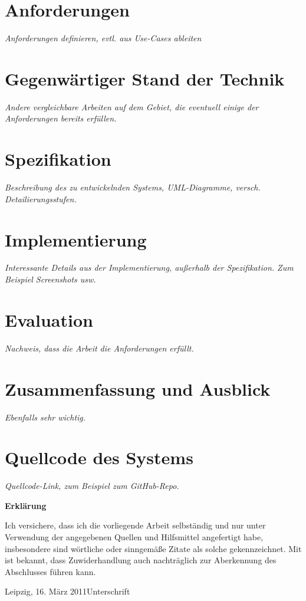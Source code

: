 \documentclass[%
  parskip=half,
  ]{scrreprt} %
\newcommand{\rem}[1]{\textcolor{remcolor}{\emph{#1}}}
\begin{document}
\chapter{Anforderungen}\label{chap:requirements}
\rem{Anforderungen definieren, evtl. aus Use-Cases ableiten}

\chapter{Gegenwärtiger Stand der Technik}\label{chap:stateoftheart}
\rem{Andere vergleichbare Arbeiten auf dem Gebiet, die eventuell einige der 
Anforderungen bereits erfüllen.}

\chapter{Spezifikation}\label{chap:spezifikation}
\rem{Beschreibung des zu entwickelnden Systems, 
UML-Diagramme, versch. Detailierungs\-stufen.}

\chapter{Implementierung}\label{chap:implementierung}
\rem{Interessante Details aus der Implementierung, außerhalb der Spezifikation.
Zum Beispiel Screenshots usw.}

\chapter{Evaluation}\label{chap:evaluation}
\rem{Nachweis, dass die Arbeit die Anforderungen erfüllt.}

\chapter{Zusammenfassung und Ausblick} \label{chap:diskussion}
\rem{Ebenfalls sehr wichtig.}

\appendix

\chapter{Quellcode des Systems}
\rem{Quellcode-Link, zum Beispiel zum GitHub-Repo.}




\clearpage
\pagestyle{empty}
\vspace*{1cm}
\begin{center}
\textbf{\sffamily Erklärung}
\end{center}
\vspace*{0.5cm}
Ich versichere, dass ich die vorliegende Arbeit selbständig und nur unter Verwendung der angegebenen Quellen und Hilfsmittel angefertigt habe, insbesondere sind wörtliche oder sinngemäße Zitate als solche gekennzeichnet. Mit ist bekannt, dass Zuwiderhandlung auch nachträglich zur Aberkennung des Abschlusses führen kann.

\vspace{2cm}
\noindent
Leipzig, 16. März 2011\hfill Unterschrift
\end{document}
